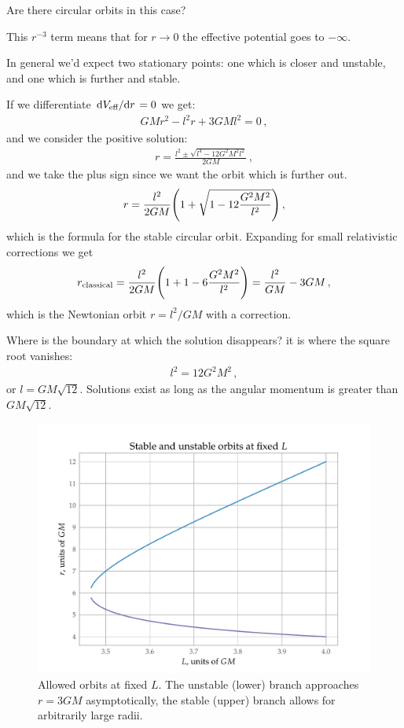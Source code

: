 \documentclass[main.tex]{subfiles}
\begin{document}
Are there circular orbits in this case? 

This \(r^{-3}\) term means that for \(r \rightarrow 0\) the effective potential goes to \(- \infty\).

In general we'd expect two stationary points: one which is closer and unstable, and one which is further and stable.

If we differentiate \(\dv*{V _{\text{eff}}}{r}= 0\) we get: 
%
\begin{align}
  GM r^2 - l^2 r + 3GM l^2 = 0
\,,
\end{align}
%
and we consider the positive solution: 
%
\begin{align}
  r= \frac{l^2 \pm \sqrt{l^4 - 12 G^2M^2l^2}}{2GM}
\,,
\end{align}
%
and we take the plus sign since we want the orbit which is further out. 
%
\begin{align}
  r = \frac{l^2}{2GM} \qty(1 + \sqrt{1 - 12 \frac{G^2M^2}{l^2}})
\,,
\end{align}
%
which is the formula for the stable circular orbit.
Expanding for small relativistic corrections we get 
%
\begin{align}
  r _{\text{classical}} = \frac{l^2}{2GM} \qty(1+1-6 \frac{G^2M^2}{l^2}) = \frac{l^2}{GM} - 3GM
\,,
\end{align}
%
which is the Newtonian orbit \(r = l^2/GM\) with a correction.

Where is the boundary at which the solution disappears? it is where the square root vanishes: 
%
\begin{align}
  l^2 = 12 G^2 M^2
\,,
\end{align}
%
or \(l = GM \sqrt{12}\). Solutions exist as long as the angular momentum is greater than \(GM \sqrt{12}\).

\begin{figure}[H]
\centering
\includegraphics[width=\textwidth]{figures/fixed_L_orbits.pdf}
\caption{Allowed orbits at fixed \(L\). The unstable (lower) branch approaches \(r = 3GM\) asymptotically, the stable (upper) branch allows for arbitrarily large radii.}
\label{fig:fixed_L_orbits.pdf}
\end{figure}
  
\end{document}
